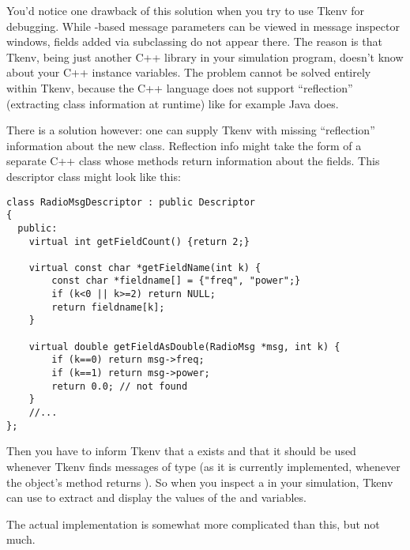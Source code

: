 You'd notice one drawback of this solution when you try to use
Tkenv for debugging. While -based message parameters can be viewed in
message inspector windows, fields added via subclassing do not appear
there. The reason is that Tkenv, being just another C++ library in your
simulation program, doesn't know about your C++ instance variables.
The problem cannot be solved entirely within Tkenv, because the C++ language
does not support ``reflection'' (extracting class information at runtime)
like for example Java does.

There is a solution however: one can supply Tkenv with missing ``reflection''
information about the new class. Reflection info might take the form of
a separate C++ class whose methods return information about the
 fields. This descriptor class might look like this:

\begin{verbatim}
class RadioMsgDescriptor : public Descriptor
{
  public:
    virtual int getFieldCount() {return 2;}

    virtual const char *getFieldName(int k) {
        const char *fieldname[] = {"freq", "power";}
        if (k<0 || k>=2) return NULL;
        return fieldname[k];
    }

    virtual double getFieldAsDouble(RadioMsg *msg, int k) {
        if (k==0) return msg->freq;
        if (k==1) return msg->power;
        return 0.0; // not found
    }
    //...
};
\end{verbatim}

Then you have to inform Tkenv that a  exists and that it
should be used whenever Tkenv finds messages of type  (as it is
currently implemented, whenever the object's  method returns
). So when you inspect a  in your simulation, Tkenv
can use  to extract and display the values of
the  and  variables.

The actual implementation is somewhat more complicated than this, but not
much.

